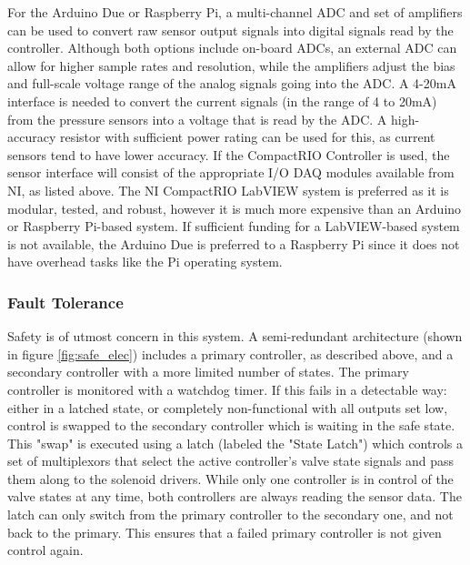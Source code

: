        For the Arduino Due or Raspberry Pi, a multi-channel \ac{ADC} and set of amplifiers can be used to convert raw sensor output signals into digital signals read by the controller. Although both options include on-board ADCs, an external ADC can allow for higher sample rates and resolution, while the amplifiers adjust the bias and full-scale voltage range of the analog signals going into the ADC. A 4-20mA interface is needed to convert the current signals (in the range of 4 to 20mA) from the pressure sensors into a voltage that is read by the ADC. A high-accuracy resistor with sufficient power rating can be used for this, as current sensors tend to have lower accuracy. If the CompactRIO Controller is used, the sensor interface will consist of the appropriate I/O \ac{DAQ} modules available from NI, as listed above. The NI CompactRIO LabVIEW system is preferred as it is modular, tested, and robust, however it is much more expensive than an Arduino or Raspberry Pi-based system. If sufficient funding for a LabVIEW-based system is not available, the Arduino Due is preferred to a Raspberry Pi since it does not have overhead tasks like the Pi operating system.

    \subsubsection{Fault Tolerance}

        Safety is of utmost concern in this system. A semi-redundant architecture (shown in figure \ref{fig:safe_elec}) includes a primary controller, as described above, and a secondary controller with a more limited number of states. The primary controller is monitored with a watchdog timer. If this fails in a detectable way: either in a latched state, or completely non-functional with all outputs set low, control is swapped to the secondary controller which is waiting in the safe state. This "swap" is executed using a latch (labeled the "State Latch") which controls a set of multiplexors that select the active controller's valve state signals and pass them along to the solenoid drivers. While only one controller is in control of the valve states at any time, both controllers are always reading the sensor data. The latch can only switch from the primary controller to the secondary one, and not back to the primary. This ensures that a failed primary controller is not given control again.
        
